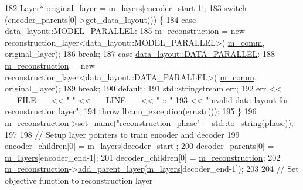 \begin{DoxyCode}
182   Layer* original\_layer = \hyperlink{classlbann_1_1model_a0229fc226ec163d1411548446104569d}{m\_layers}[encoder\_start-1];
183   \textcolor{keywordflow}{switch} (encoder\_parents[0]->get\_data\_layout()) \{
184   \textcolor{keywordflow}{case} \hyperlink{base_8hpp_a786677cbfb3f5677b4d84f3056eb08dbac94d7b0e44ab8bdcdad694a673cdeae0}{data\_layout::MODEL\_PARALLEL}:
185     \hyperlink{classlbann_1_1greedy__layerwise__autoencoder_a8238d2e3e723543c8b6f7f5c61a9ca06}{m\_reconstruction} = \textcolor{keyword}{new} reconstruction\_layer<data\_layout::MODEL\_PARALLEL>(
      \hyperlink{classlbann_1_1model_a0eabaf2b2f829fd5db3dfd26df420df0}{m\_comm}, original\_layer);
186     \textcolor{keywordflow}{break};
187   \textcolor{keywordflow}{case} \hyperlink{base_8hpp_a786677cbfb3f5677b4d84f3056eb08dba37d2a3465f7cbf4ab60f4e79944d0638}{data\_layout::DATA\_PARALLEL}:
188     \hyperlink{classlbann_1_1greedy__layerwise__autoencoder_a8238d2e3e723543c8b6f7f5c61a9ca06}{m\_reconstruction} = \textcolor{keyword}{new} reconstruction\_layer<data\_layout::DATA\_PARALLEL>(
      \hyperlink{classlbann_1_1model_a0eabaf2b2f829fd5db3dfd26df420df0}{m\_comm}, original\_layer);
189     \textcolor{keywordflow}{break};
190   \textcolor{keywordflow}{default}:
191     std::stringstream err;
192     err << \_\_FILE\_\_ << \textcolor{stringliteral}{" "} << \_\_LINE\_\_ << \textcolor{stringliteral}{" :: "}
193         << \textcolor{stringliteral}{"invalid data layout for reconstruction layer"};
194     \textcolor{keywordflow}{throw} lbann\_exception(err.str());
195   \}
196   \hyperlink{classlbann_1_1greedy__layerwise__autoencoder_a8238d2e3e723543c8b6f7f5c61a9ca06}{m\_reconstruction}->\hyperlink{classlbann_1_1Layer_a82d8a038861b0af0d54fbf44ce715839}{set\_name}(\textcolor{stringliteral}{"reconstruction\_phase"} + std::to\_string(phase));
197 
198   \textcolor{comment}{// Setup layer pointers to train encoder and decoder}
199   encoder\_children[0] = \hyperlink{classlbann_1_1model_a0229fc226ec163d1411548446104569d}{m\_layers}[decoder\_start];
200   decoder\_parents[0] = \hyperlink{classlbann_1_1model_a0229fc226ec163d1411548446104569d}{m\_layers}[encoder\_end-1];
201   decoder\_children[0] = \hyperlink{classlbann_1_1greedy__layerwise__autoencoder_a8238d2e3e723543c8b6f7f5c61a9ca06}{m\_reconstruction};
202   \hyperlink{classlbann_1_1greedy__layerwise__autoencoder_a8238d2e3e723543c8b6f7f5c61a9ca06}{m\_reconstruction}->\hyperlink{classlbann_1_1Layer_a326668ce624a9bcc719a463820b2e3a4}{add\_parent\_layer}(\hyperlink{classlbann_1_1model_a0229fc226ec163d1411548446104569d}{m\_layers}[decoder\_end-1]);
203 
204   \textcolor{comment}{// Set objective function to reconstruction layer}

\end{DoxyCode}
